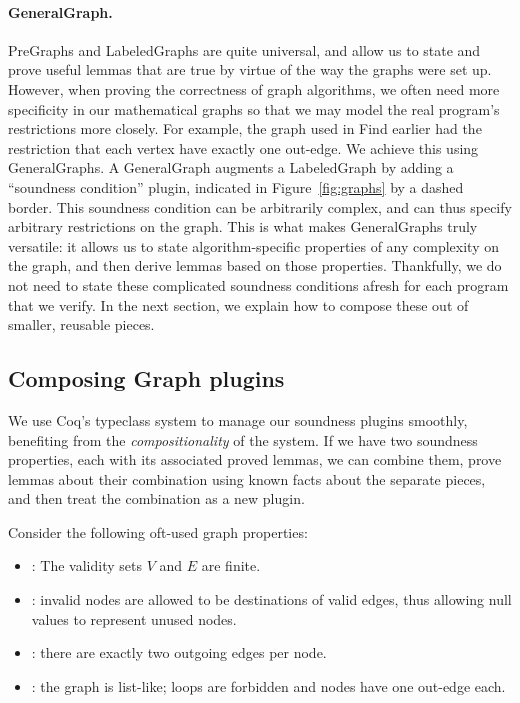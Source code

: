 \paragraph{GeneralGraph.}
PreGraphs and LabeledGraphs are quite universal, and allow us 
to state and prove useful lemmas that are true by virtue of the 
way the graphs were set up. However, when proving the correctness
of graph algorithms, we often need more specificity in our mathematical graphs
so that we may model the real program's restrictions more closely. 
For example, the graph used in Find earlier had the restriction 
that each vertex have exactly one out-edge. 
We achieve this using GeneralGraphs. 
A GeneralGraph augments a LabeledGraph by adding a 
``soundness condition'' plugin, indicated in 
Figure~\ref{fig:graphs} by a dashed border. 
This soundness condition can be arbitrarily complex, 
and can thus specify arbitrary restrictions on the graph. 
This is what makes GeneralGraphs truly versatile: 
it allows us to state algorithm-specific properties 
of any complexity on the graph, and then derive lemmas based on those properties.
Thankfully, we do not need to state these complicated soundness 
conditions afresh for each program that we verify. In the next section, 
we explain how to compose these out of smaller, reusable pieces.

\subsection{Composing Graph plugins}
\label{subsec:graphplugins}

We use Coq's typeclass system to manage our soundness plugins smoothly, 
benefiting from the \emph{compositionality} of the system. 
If we have two soundness properties, each with its associated proved lemmas, 
we can combine them, 
prove lemmas about their combination using known facts about 
the separate pieces,
and then treat the combination as a new plugin. 

Consider the following oft-used graph properties:
\begin{itemize}
\vspace{-1ex}
\item {}: The validity sets $V$ and $E$ are finite.
\item {}: invalid nodes are allowed to be destinations
of valid edges, thus allowing null values to represent unused nodes.
\item {}: there are exactly two outgoing edges per node. 
\item {}: the graph is list-like; loops are forbidden and 
nodes have one out-edge each.
\end{itemize}


